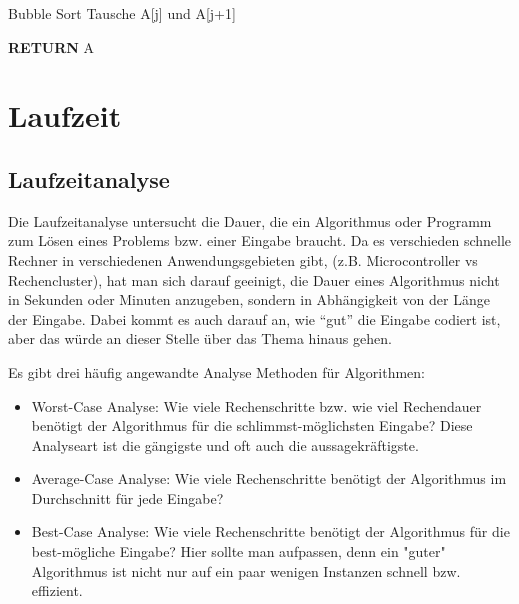 \documentclass{panikzettel}
\newcommand\tab[1][1cm]{\hspace*{#1}}
\begin{document}
{\begin{halfboxr}
\begin{algo}{Bubble Sort}
		\tab\tab\tab Tausche A[j] und A[j+1]
		
		\textbf{RETURN} A
	\end{algo}
\end{halfboxr}





\section{Laufzeit}

\subsection{Laufzeitanalyse}


Die Laufzeitanalyse untersucht die Dauer, die ein Algorithmus oder Programm zum Lösen eines Problems bzw. einer Eingabe braucht. Da es verschieden schnelle Rechner in verschiedenen Anwendungsgebieten gibt, (z.B. Microcontroller vs Rechencluster), hat man sich darauf geeinigt, die Dauer eines Algorithmus nicht in Sekunden oder Minuten anzugeben, sondern in Abhängigkeit von der Länge der Eingabe. Dabei kommt es auch darauf an, wie ``gut'' die Eingabe codiert ist, aber das würde an dieser Stelle über das Thema hinaus gehen. 

Es gibt drei häufig angewandte Analyse Methoden für Algorithmen:

\begin{itemize}
	\item Worst-Case Analyse: Wie viele Rechenschritte bzw. wie viel Rechendauer benötigt der Algorithmus für die schlimmst-möglichsten Eingabe? Diese Analyseart ist die gängigste und oft auch die aussagekräftigste.
	\item Average-Case Analyse: Wie viele Rechenschritte benötigt der Algorithmus im Durchschnitt für jede Eingabe? 
	\item Best-Case Analyse: Wie viele Rechenschritte benötigt der Algorithmus für die best-mögliche Eingabe? Hier sollte man aufpassen, denn ein "guter" Algorithmus ist nicht nur auf ein paar wenigen Instanzen schnell bzw. effizient.
\end{itemize}

}
\end{document}
